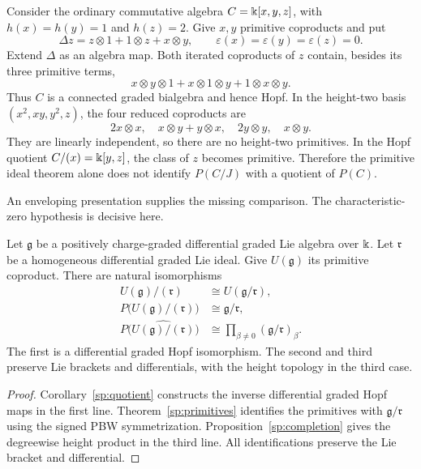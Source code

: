 \begin{example}\label{new-primitives}
Consider the ordinary commutative algebra $C=\Bbbk[x,y,z]$, with
$h(x)=h(y)=1$ and $h(z)=2$.  Give $x,y$ primitive coproducts and put
\[
 \Delta z=z\otimes1+1\otimes z+x\otimes y,
 \qquad\varepsilon(x)=\varepsilon(y)=\varepsilon(z)=0.
\]
Extend $\Delta$ as an algebra map.  Both iterated coproducts of $z$
contain, besides its three primitive terms,
\[
 x\otimes y\otimes1+x\otimes1\otimes y+1\otimes x\otimes y.
\]
Thus $C$ is a connected graded bialgebra and hence Hopf.
In the height-two basis $(x^2,xy,y^2,z)$, the four reduced coproducts are
\[
 2x\otimes x,\quad x\otimes y+y\otimes x,\quad
 2y\otimes y,\quad x\otimes y.
\]
They are linearly independent, so there are no height-two primitives.
In the Hopf quotient $C/(x)=\Bbbk[y,z]$, the class of $z$ becomes
primitive.  Therefore the primitive ideal theorem alone does not
identify $P(C/J)$ with a quotient of $P(C)$.
\end{example}

An enveloping presentation supplies the missing comparison.
The characteristic-zero hypothesis is decisive here.

\begin{proposition}
\label{enveloping-quotient}
Let $\mathfrak g$ be a positively charge-graded differential graded Lie
algebra over $\Bbbk$.  Let $\mathfrak r$ be a homogeneous differential
graded Lie ideal.  Give $U(\mathfrak g)$ its primitive coproduct.
There are natural isomorphisms
\begin{align*}
 U(\mathfrak g)/(\mathfrak r)&\cong U(\mathfrak g/\mathfrak r),\\
 P\bigl(U(\mathfrak g)/(\mathfrak r)\bigr)&\cong
 \mathfrak g/\mathfrak r,\\
 P\bigl(\widehat{U(\mathfrak g)/(\mathfrak r)}\bigr)&\cong
 \prod_{\beta\neq0}(\mathfrak g/\mathfrak r)_\beta.
\end{align*}
The first is a differential graded Hopf isomorphism.  The second and
third preserve Lie brackets and differentials, with the height topology
in the third case.
\end{proposition}

\begin{proof}
Corollary~\ref{sp:quotient} constructs the inverse differential graded
Hopf maps in the first line. Theorem~\ref{sp:primitives} identifies the
primitives with $\mathfrak g/\mathfrak r$ using the signed PBW
symmetrization. Proposition~\ref{sp:completion} gives the degreewise
height product in the third line. All identifications preserve the
Lie bracket and differential.
\end{proof}

